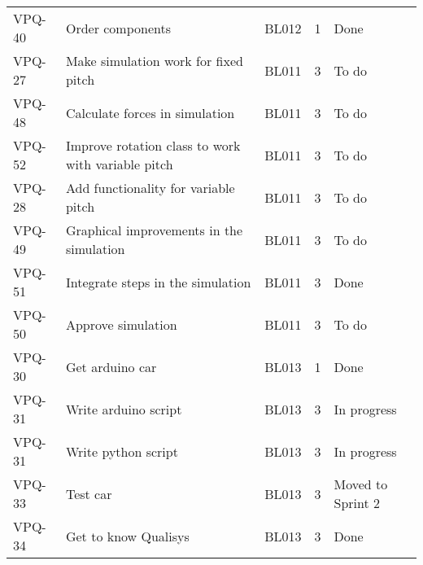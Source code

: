 \begin{table}[ht]
\begin{tabularx}{\linewidth}{|m{1.5cm} m{6.65cm} m{1.2cm} m{1.5cm} m{3.5cm}|}
            VPQ-40 & Order components & BL012 & 1\centering & Done  \\
\rowcolor{gainsboro}  VPQ-27 & Make simulation work for fixed pitch & BL011 & 3\centering & To do  \\
            VPQ-48 & Calculate forces in simulation & BL011 & 3\centering & To do  \\
\rowcolor{gainsboro}  VPQ-52 & Improve rotation class to work with variable pitch & BL011 & 3\centering & To do  \\
            VPQ-28 & Add functionality for variable pitch & BL011 & 3\centering & To do  \\
\rowcolor{gainsboro}  VPQ-49 & Graphical improvements in the simulation & BL011 & 3\centering & To do  \\
            VPQ-51 & Integrate steps in the simulation & BL011 & 3\centering & Done  \\
\rowcolor{gainsboro}  VPQ-50 & Approve simulation & BL011 & 3\centering & To do  \\
            VPQ-30 & Get arduino car & BL013 & 1\centering & Done  \\
\rowcolor{gainsboro}  VPQ-31 & Write arduino script & BL013 & 3\centering & In progress  \\
            VPQ-31 & Write python script & BL013 & 3\centering & In progress  \\
\rowcolor{gainsboro}  VPQ-33 & Test car & BL013 & 3\centering & Moved to Sprint 2  \\
            VPQ-34 & Get to know Qualisys & BL013 & 3\centering & Done  \\
\hline    
\end{tabularx}
\end{table}
\newpage



